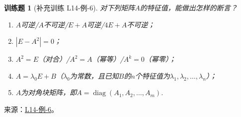 \documentclass[12pt,fontset=fandol]{ctexart}
\newtheorem{exercise}{训练题}[section]
\begin{document}
\begin{exercise}[补充训练 L14-例-6]\label{prob:L14-例-6}
对下列矩阵$A$的特征值，能做出怎样的断言？
    \begin{enumerate}
        \item $A$可逆/$A$不可逆/$E+A$可逆/$4E+A$不可逆；

        \item $|E - A^2| = 0$；

        \item $A^2 = E$（对合）/$A^2 = A$（幂等）/$A^k = 0$（幂零）；

        \item $A=\lambda_0E+B$（$\lambda_0$为常数，且已知$B$的$n$个特征值为$\lambda_1,\lambda_2,\ldots,\lambda_n$）；

        \item $A$为对角块矩阵，即$A=\operatorname{diag}(A_1,A_2,\ldots,A_m)$.
    \end{enumerate}
\end{exercise}
\noindent 来源：\href{https://github.com/yhwu-is/Linear-Algebra-Left-Undone/blob/new/%E8%AE%B2%E4%B9%89/%E4%B8%93%E9%A2%98/14%20%E7%9B%B8%E4%BC%BC%E6%A0%87%E5%87%86%E5%BD%A2%EF%BC%9A%E5%8A%A8%E6%9C%BA%E4%B8%8E%E5%9F%BA%E7%A1%80.tex}{L14-例-6}。
\end{document}
